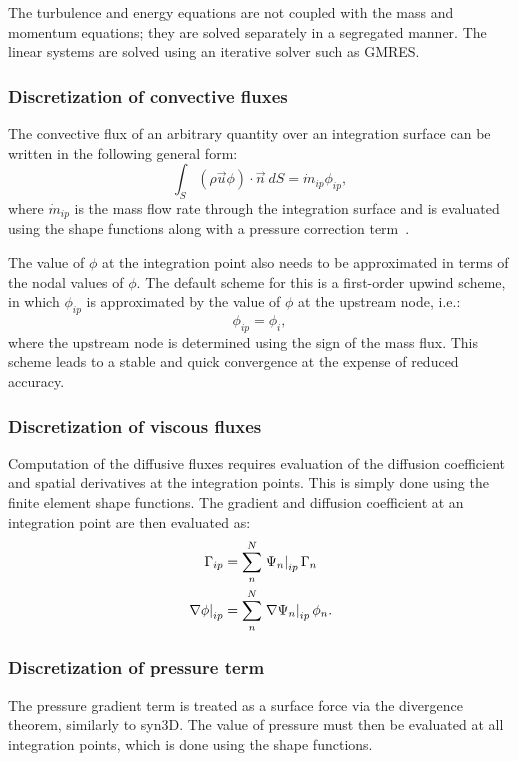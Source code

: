 The turbulence and energy equations are not coupled with the mass and momentum equations; they are solved separately in a segregated manner. The linear systems are solved using an iterative solver such as GMRES.

\subsubsection{Discretization of convective fluxes}
The convective flux of an arbitrary quantity over an integration surface can be written in the following general form:
\begin{equation*}
    \int_S (\rho\vec{u}\phi)\cdot\vec{n}~dS = \dot{m}_{ip}\phi_{ip},
\end{equation*}
where $\dot{m}_{ip}$ is the mass flow rate through the integration surface and is evaluated using the shape functions along with a pressure correction term~\cite{schneider1987control,rhie1983numerical}.

The value of $\phi$ at the integration point also needs to be approximated in terms of the nodal values of $\phi$. The default scheme for this is a first-order upwind scheme, in which $\phi_{ip}$ is approximated by the value of $\phi$ at the upstream node, i.e.:
\begin{equation*}
    \phi_{ip} = \phi_{i},
\end{equation*}
where the upstream node is determined using the sign of the mass flux. This scheme leads to a stable and quick convergence at the expense of reduced accuracy.

\subsubsection{Discretization of viscous fluxes}
Computation of the diffusive fluxes requires evaluation of the diffusion coefficient and spatial derivatives at the integration points. This is simply done using the finite element shape functions. The gradient and diffusion coefficient at an integration point are then evaluated as:
\begin{align*}
    \Gamma_{ip} &= \sum_n^N \left.\Psi_n\right|_{ip}\Gamma_n \\
    \left.\nabla\phi\right|_{ip} &= \sum_n^N \left.\nabla\Psi_n\right|_{ip}\phi_n.
\end{align*}

\subsubsection{Discretization of pressure term}
The pressure gradient term is treated as a surface force via the divergence theorem, similarly to syn3D. The value of pressure must then be evaluated at all integration points, which is done using the shape functions.

